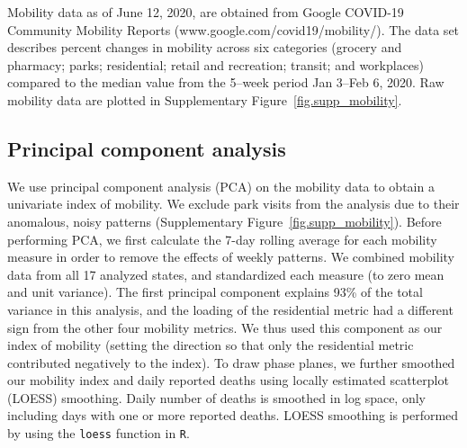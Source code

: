 Mobility data as of June 12, 2020, are obtained from Google COVID-19 Community Mobility Reports (www.google.com/covid19/mobility/).
The data set describes percent changes in mobility across six categories (grocery and pharmacy; parks; residential; retail and recreation; transit; and workplaces)
compared to the median value from the 5--week period Jan 3--Feb 6, 2020.
Raw mobility data are plotted in Supplementary Figure~\ref{fig.supp_mobility}.

\subsection{Principal component analysis}

We use principal component analysis (PCA) on the mobility data to obtain a univariate index of mobility. 
We exclude park visits from the analysis due to their anomalous, noisy patterns (Supplementary Figure~\ref{fig.supp_mobility}).
Before performing PCA, we first calculate the 7-day rolling average for each mobility measure in order to remove the effects of weekly patterns.
We combined mobility data from all 17 analyzed states, and standardized each measure (to zero mean and unit variance). 
The first principal component explains 93\% of the total variance in this analysis, and the loading of the residential metric had a different sign from the other four mobility metrics. 
We thus used this component as our index of mobility (setting the direction so that only the residential metric contributed negatively to the index).
To draw phase planes, we further smoothed our mobility index and daily reported deaths using locally estimated scatterplot (LOESS) smoothing.
Daily number of deaths is smoothed in log space, only including days with one or more reported deaths.
LOESS smoothing is performed by using the \texttt{loess} function in \texttt{R}.


